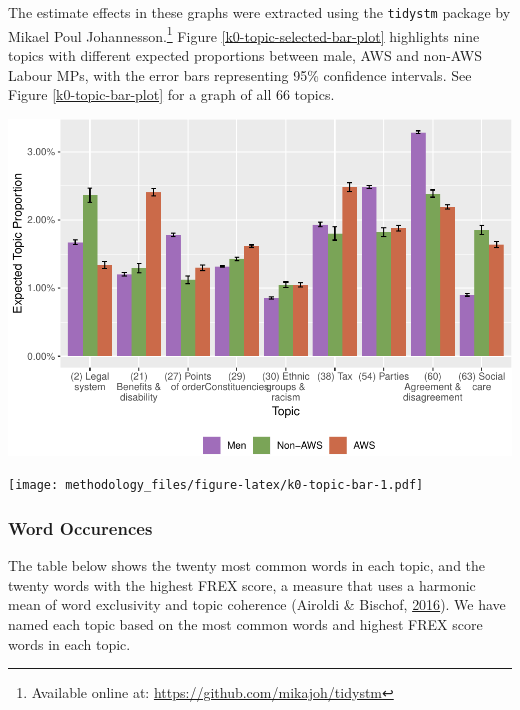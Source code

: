 \documentclass[]{article}
\let\rmarkdownfootnote\footnote%
\def\footnote{\protect\rmarkdownfootnote}
\let\origfigure\figure
\let\endorigfigure\endfigure
\renewenvironment{figure}[1][2] {
    \expandafter\origfigure\expandafter[H]
} {
    \endorigfigure
}
\begin{document}
The estimate effects in these graphs were extracted using the
\texttt{tidystm} package by Mikael Poul Johannesson.\footnote{Available
  online at: \url{https://github.com/mikajoh/tidystm}} Figure
\ref{k0-topic-selected-bar-plot} highlights nine topics with different
expected proportions between male, AWS and non-AWS Labour MPs, with the
error bars representing 95\% confidence intervals. See Figure
\ref{k0-topic-bar-plot} for a graph of all 66 topics.

\begin{figure}
\centering
\includegraphics{methodology_files/figure-latex/tidystm-graphs-1.pdf}
\caption{\label{k0-topic-selected-bar-plot}Selected Topic Proportions}
\end{figure}

\begin{figure}
\centering
\texttt{[image: methodology\_files/figure-latex/k0-topic-bar-1.pdf]}
\caption{\label{k0-topic-bar-plot}All Topic Proportions}
\end{figure}

\hypertarget{word-occurences}{%
\subsubsection{Word Occurences}\label{word-occurences}}

The table below shows the twenty most common words in each topic, and
the twenty words with the highest FREX score, a measure that uses a
harmonic mean of word exclusivity and topic coherence (Airoldi \&
Bischof, \protect\hyperlink{ref-airoldi2016}{2016}). We have named each
topic based on the most common words and highest FREX score words in
each topic.
\end{document}
